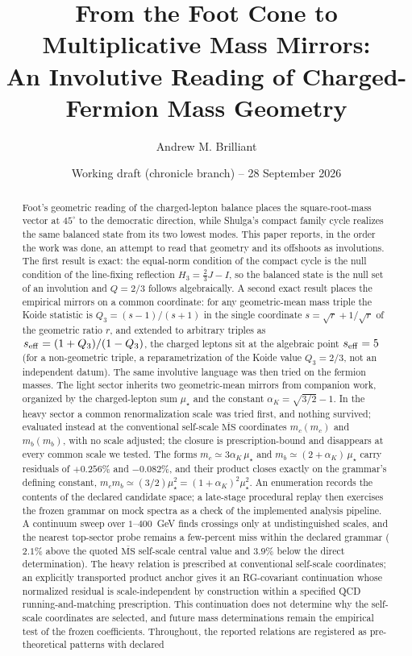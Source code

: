 \documentclass[aps,twocolumn,superscriptaddress,nofootinbib,floatfix]{revtex4-2}
\newcommand{\MSbar}{\overline{\mathrm{MS}}}
\newcommand{\mstar}{\mu_\star}
\newcommand{\alphaK}{\alpha_K}
\begin{document}
\title{From the Foot Cone to Multiplicative Mass Mirrors:\\
An Involutive Reading of Charged-Fermion Mass Geometry}

\author{Andrew M. Brilliant}
\date{Working draft (chronicle branch) -- 28 September 2026}

\begin{abstract}
Foot's geometric reading of the charged-lepton balance places the square-root-mass vector at $45^\circ$ to the democratic direction, while Shulga's compact family cycle realizes the same balanced state from its two lowest modes. This paper reports, in the order the work was done, an attempt to read that geometry and its offshoots as involutions. The first result is exact: the equal-norm condition of the compact cycle is the null condition of the line-fixing reflection $H_3=\frac23J-I$, so the balanced state is the null set of an involution and $Q=2/3$ follows algebraically. A second exact result places the empirical mirrors on a common coordinate: for any geometric-mean mass triple the Koide statistic is $Q_3=(s-1)/(s+1)$ in the single coordinate $s=\sqrt{r}+1/\sqrt{r}$ of the geometric ratio $r$, and extended to arbitrary triples as $s_{\rm eff}=(1+Q_3)/(1-Q_3)$, the charged leptons sit at the algebraic point $s_{\rm eff}=5$ (for a non-geometric triple, a reparametrization of the Koide value $Q_3=2/3$, not an independent datum). The same involutive language was then tried on the fermion masses. The light sector inherits two geometric-mean mirrors from companion work, organized by the charged-lepton sum $\mstar$ and the constant $\alphaK=\sqrt{3/2}-1$. In the heavy sector a common renormalization scale was tried first, and nothing survived; evaluated instead at the conventional self-scale $\MSbar$ coordinates $m_c(m_c)$ and $m_b(m_b)$, with no scale adjusted; the closure is prescription-bound and disappears at every common scale we tested. The forms $m_c\simeq3\alphaK\,\mstar$ and $m_b\simeq(2+\alphaK)\,\mstar$ carry residuals of $+0.256\%$ and $-0.082\%$, and their product closes exactly on the grammar's defining constant, $m_cm_b\simeq(3/2)\mstar^2=(1+\alphaK)^2\mstar^2$. An enumeration records the contents of the declared candidate space; a late-stage procedural replay then exercises the frozen grammar on mock spectra as a check of the implemented analysis pipeline. A continuum sweep over $1$--$400$~GeV finds crossings only at undistinguished scales, and the nearest top-sector probe remains a few-percent miss within the declared grammar ($2.1\%$ above the quoted $\MSbar$ self-scale central value and $3.9\%$ below the direct determination). The heavy relation is prescribed at conventional self-scale coordinates; an explicitly transported product anchor gives it an RG-covariant continuation whose normalized residual is scale-independent by construction within a specified QCD running-and-matching prescription. This continuation does not determine why the self-scale coordinates are selected, and future mass determinations remain the empirical test of the frozen coefficients. Throughout, the reported relations are registered as pre-theoretical patterns with declared 
\end{abstract}
\end{document}
